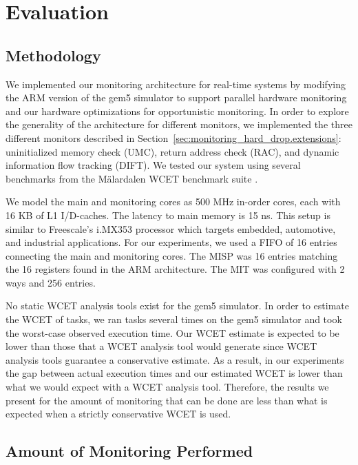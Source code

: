 \section{Evaluation}
\label{sec:monitoring_hard_drop.evaluation}

\subsection{Methodology} 
\label{sec:monitoring_hard_drop.evaluation.methodology}

We implemented our monitoring architecture for real-time systems by modifying
the ARM version of the gem5 simulator \cite{gem5} to support parallel hardware
monitoring and our hardware optimizations for opportunistic monitoring. In
order to explore the generality of the architecture for different monitors, we
implemented the three different monitors described in
Section~\ref{sec:monitoring_hard_drop.extensions}: uninitialized memory check
(UMC), return address check (RAC), and dynamic information flow tracking
(DIFT). We tested our system using several benchmarks from the M{\"a}lardalen
WCET benchmark suite \cite{malardalen}. 

We model the main and monitoring cores as 500 MHz in-order cores, each with 16
KB of L1 I/D-caches. The latency to main memory is 15 ns. This setup is
similar to Freescale's i.MX353 processor which targets embedded, automotive,
and industrial applications. For our experiments, we used a FIFO of 16 entries
connecting the main and monitoring cores. The MISP was 16 entries matching the
16 registers found in the ARM architecture. The MIT was configured with 2 ways
and 256 entries. 

No static WCET analysis tools exist for the gem5 simulator. In order to
estimate the WCET of tasks, we ran tasks several times on the gem5 simulator
and took the worst-case observed execution time. Our WCET estimate is expected
to be lower than those that a WCET analysis tool would generate since WCET
analysis tools guarantee a conservative estimate. As a result, in our
experiments the gap between actual execution times and our estimated WCET is
lower than what we would expect with a WCET analysis tool. Therefore, the
results we present for the amount of monitoring that can be done are less than
what is expected when a strictly conservative WCET is used.

\subsection{Amount of Monitoring Performed}
\label{sec:monitoring_hard_drop.evaluation.coverage}

